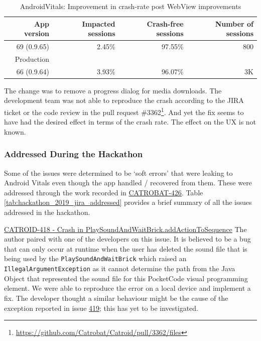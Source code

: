 \begin{table}[htbp!]
    \centering
    \footnotesize
    \begin{tabular}{r|r|r|r}
        App version &Impacted sessions &Crash-free sessions &Number of sessions  \\
        \hline
        69 (0.9.65) &2.45\% &	97.55\% 	&~800 \\
        Production &&& \\
        \hline
        66 (0.9.64) &3.93\% &96.07\% 	&~3K
    \end{tabular}
    \caption{AndroidVitals: Improvement in crash-rate post WebView improvements}
    \label{tab:androidvitals_rollout_of_0_9_65}
\end{table}

The change was to remove a progress dialog for media downloads. The development team was not able to reproduce the crash according to the JIRA ticket or the code review in the pull request \#3362\footnote{\url{https://github.com/Catrobat/Catroid/pull/3362/files}}. And yet the fix seems to have had the desired effect in terms of the crash rate. The effect on the UX is not known.

\subsubsection{Addressed During the Hackathon}
Some of the issues were determined to be `soft errors' that were leaking to Android Vitals even though the app handled / recovered from them. These were addressed through the work recorded in  \href{https://jira.catrob.at/browse/CATROID-426}{CATROBAT-426}. Table \ref{tab:hackathon_2019_jira_addressed} provides a brief summary of all the issues addressed in the hackathon.


\href{https://jira.catrob.at/browse/CATROID-418}{CATROID-418 - Crash in PlaySoundAndWaitBrick.addActionToSequence} The author paired with one of the developers on this issue. It is believed to be a bug that can only occur at runtime when the user has deleted the sound file that is being used by the \texttt{PlaySoundAndWaitBrick} which raised an \texttt{IllegalArgumentException} as it cannot determine the path from the Java Object that represented the sound file for this PocketCode visual programming element. We were able to reproduce the error on a local device and implement a fix. The developer thought a similar behaviour might be the cause of the exception reported in issue \href{https://jira.catrob.at/browse/CATROID-419}{419}; this has yet to be investigated.

